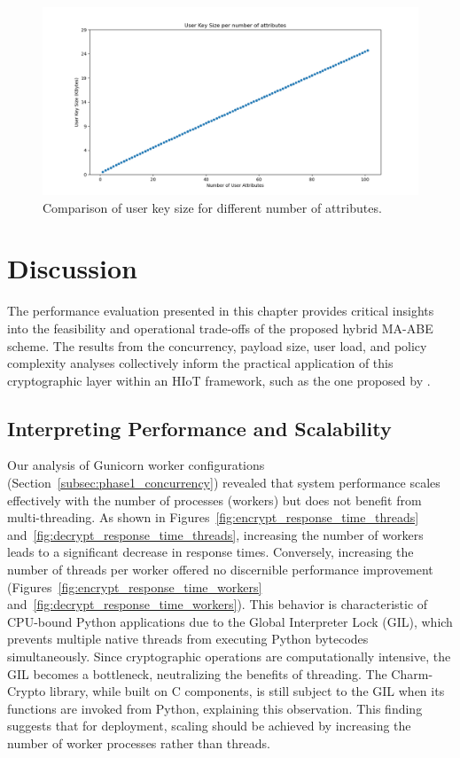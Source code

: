 \documentclass[cic,tc,english]{iiufrgs}
\numberwithin{algorithm}{chapter}
\begin{document}
            \begin{figure}
                \centering
                \includegraphics[width=\textwidth]{images/key_size_analysis/user_key_size_analysis.png}
                \caption{Comparison of user key size for different number of attributes.}
                \label{fig:user_key_size}
            \end{figure}


        \section{Discussion}
            \label{sec:discussion}
            The performance evaluation presented in this chapter provides critical insights into the feasibility and operational trade-offs of the proposed hybrid MA-ABE scheme. The results from the concurrency, payload size, user load, and policy complexity analyses collectively inform the practical application of this cryptographic layer within an HIoT framework, such as the one proposed by \citet{laura2023}.

            \subsection{Interpreting Performance and Scalability}

                Our analysis of Gunicorn worker configurations (Section~\ref{subsec:phase1_concurrency}) revealed that system performance scales effectively with the number of processes (workers) but does not benefit from multi-threading. As shown in Figures~\ref{fig:encrypt_response_time_threads} and~\ref{fig:decrypt_response_time_threads}, increasing the number of workers leads to a significant decrease in response times. Conversely, increasing the number of threads per worker offered no discernible performance improvement (Figures~\ref{fig:encrypt_response_time_workers} and~\ref{fig:decrypt_response_time_workers}). This behavior is characteristic of CPU-bound Python applications due to the Global Interpreter Lock (GIL), which prevents multiple native threads from executing Python bytecodes simultaneously. Since cryptographic operations are computationally intensive, the GIL becomes a bottleneck, neutralizing the benefits of threading. The Charm-Crypto library, while built on C components, is still subject to the GIL when its functions are invoked from Python, explaining this observation. This finding suggests that for deployment, scaling should be achieved by increasing the number of worker processes rather than threads.
\end{document}
